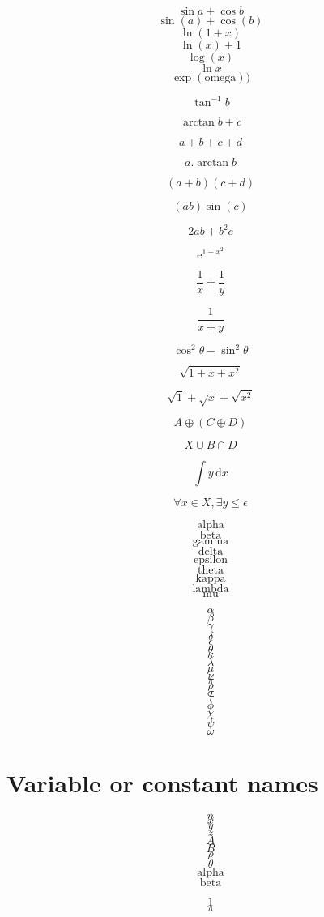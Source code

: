 \documentclass[12pt]{article}
\begin{document}
$$ \sin a + \cos b $$ 
$$ \sin(a) + \cos(b) $$
$$ \ln(1+x) $$
$$ \ln(x) + 1 $$
$$ \log(x) $$
$$ \ln x $$
$$ \exp(\mathrm{omega})) $$


$$\tan^{-1} b$$       

$$\arctan b + c$$     

$$a + b + c + d$$     

$$ a . \arctan b $$   

$$ (a+b)(c+d) $$      

$$ (ab)\sin(c) $$     

$$ 2ab + b^2 c $$     

$$ \mathrm{e}^{1-x^2} $$ 

$$ \frac{1}{x}+\frac{1}{y} $$ 

$$ \frac{1}{x+y} $$ 

$$ \cos^2 \theta - \sin^2 \theta $$ 

$$ \sqrt{1+x+x^2} $$ 

$$ \sqrt{1}+\sqrt{x}+\sqrt{x^2}$$ 


$$ A \oplus (C \oplus D) $$

$$ X \cup B \cap D $$

$$ \int y\, \mathrm{d}x$$

$$ \forall x \in X, \exists y \leq \epsilon$$



$$ \mathrm{alpha} $$
$$ \mathrm{beta} $$
$$ \mathrm{gamma} $$
$$ \mathrm{delta} $$
$$ \mathrm{epsilon} $$
$$ \mathrm{theta}  $$
$$ \mathrm{kappa} $$
$$ \mathrm{lambda} $$
$$ \mathrm{mu} $$

$$ \alpha $$
$$ \beta $$
$$ \gamma $$
$$ \delta $$
$$ \epsilon $$
$$ \theta $$
$$ \kappa $$
$$ \lambda $$
$$ \mu $$
$$ \nu $$
$$ \pi $$
$$ \rho $$
$$ \sigma $$
$$ \tau $$
$$ \phi $$
$$ \chi $$
$$ \psi $$
$$ \omega $$

\section{Variable or constant names}

$$ n $$
$$ x $$
$$ y $$
$$ z $$
$$ A $$
$$ B $$
$$ \rho $$
$$ \theta $$
$$ \mathrm{alpha} $$
$$ \mathrm{beta} $$

$$ 1 $$
$$ \pi $$
\end{document}
